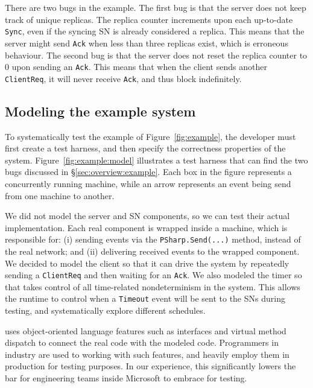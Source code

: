 There are two bugs in the example. The first bug is that the server does not keep track of unique replicas. The replica counter increments upon each up-to-date \texttt{Sync}, even if the syncing SN is already considered a replica. This means that the server might send \texttt{Ack} when less than three replicas exist, which is erroneous behaviour. The second bug is that the server does not reset the replica counter to 0 upon sending an \texttt{Ack}. This means that when the client sends another \texttt{ClientReq}, it will never receive \texttt{Ack}, and thus block indefinitely.

\vspace{-1mm}
\subsection{Modeling the example system}
\label{sec:overview:model}

To systematically test the example of Figure~\ref{fig:example}, the developer must first create a \psharp test harness, and then specify the correctness properties of the system. Figure~\ref{fig:example:model} illustrates a test harness that can find the two bugs discussed in \S\ref{sec:overview:example}. Each box in the figure represents a concurrently running \psharp machine, while an arrow represents an event being send from one machine to another.

We did not model the server and SN components, so we can test their actual implementation. Each real component is wrapped inside a \psharp machine, which is responsible for: (i) sending events via the \texttt{PSharp.Send(...)} method, instead of the real network; and (ii) delivering received events to the wrapped component. We decided to model the client so that it can drive the system by repeatedly sending a \texttt{ClientReq} and then waiting for an \texttt{Ack}. We also modeled the timer so that \psharp takes control of all time-related nondeterminism in the system. This allows the \psharp runtime to control when a \texttt{Timeout} event will be sent to the SNs during testing, and systematically explore different schedules.

\psharp uses object-oriented language features such as interfaces and virtual method dispatch to connect the real code with the modeled code. Programmers in industry are used to working with such features, and heavily employ them in production for testing purposes. In our experience, this significantly lowers the bar for engineering teams inside Microsoft to embrace \psharp for testing.


